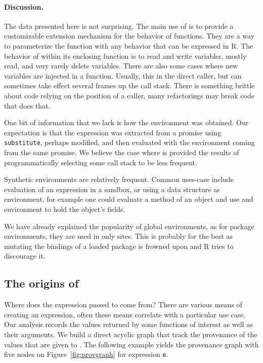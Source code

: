 \documentclass[screen,acmsmall]{acmart}%
\newcommand{\code}[1]{\lstinline |#1|\xspace}
\begin{document}
\paragraph{Discussion.}
The data presented here is not surprising. The main use of \eval is to provide a
customizable extension mechanism for the behavior of functions. They are a way
to parameterize the function with any behavior that can be expressed in R. The
behavior of \eval within its enclosing function is to read and write variables,
mostly read, and very rarely delete variables. There are also some cases where
new variables are injected in a function. Usually, this in the direct caller,
but can sometimes take effect several frames up the call stack. There is
something brittle about code relying on the position of a caller, many
refactorings may break code that does that.

One bit of information that we lack is how the environment was obtained. Our
expectation is that the expression was extracted from a promise using
\code{substitute}, perhaps modified, and then evaluated with the environment coming
from the same promise. We believe the case where \eval is provided the results
of programmatically selecting some call stack to be less frequent.

Synthetic environments are relatively frequent. Common uses-case include
evaluation of an expression in a sandbox, or using a data structure as
environment, for example one could evaluate a method of an object and use and
environment to hold the object's fields.

We have already explained the popularity of global environments, as for package
environments, they are used in only \packageNbPackageNamespaceEnvSites sites.
This is probably for the best as mutating the bindings of a loaded package is
frowned upon and R tries to discourage it.

\subsection{The origins of \eval}

Where does the expression passed to \eval come from? There are various means of
creating an expression, often these means correlate with a particular use case.
Our analysis records the values returned by some functions of interest as well
as their arguments. We build a direct acyclic graph that track the provenance of
the values that are given to \eval. The following example yields the provenance
graph with five nodes on Figure~\ref{fig:provgraph} for expression \code{e}.
\end{document}
